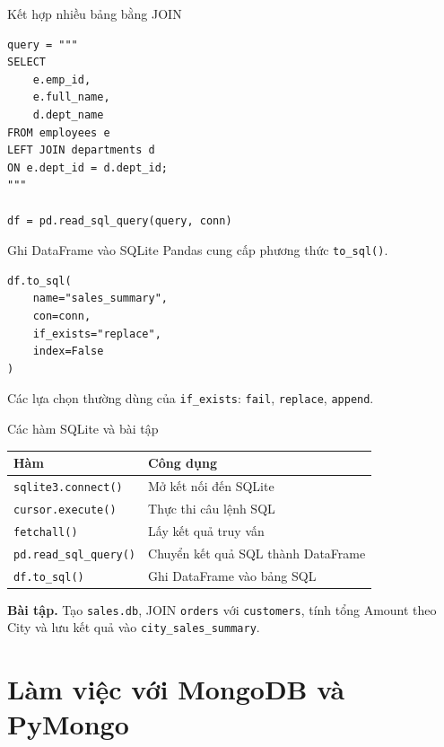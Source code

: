 \documentclass[aspectratio=169,11pt]{beamer}
\newcommand{\code}[1]{\texttt{#1}}
\newcommand{\smallgap}{\vspace{0.4em}}
\begin{document}
\begin{frame}[fragile]{Kết hợp nhiều bảng bằng JOIN}
\begin{lstlisting}[style=pythonstyle]
query = """
SELECT
    e.emp_id,
    e.full_name,
    d.dept_name
FROM employees e
LEFT JOIN departments d
ON e.dept_id = d.dept_id;
"""

df = pd.read_sql_query(query, conn)
\end{lstlisting}
\end{frame}

\begin{frame}[fragile]{Ghi DataFrame vào SQLite}
Pandas cung cấp phương thức \code{to\_sql()}.

\begin{lstlisting}[style=pythonstyle]
df.to_sql(
    name="sales_summary",
    con=conn,
    if_exists="replace",
    index=False
)
\end{lstlisting}

Các lựa chọn thường dùng của \code{if\_exists}: \code{fail}, \code{replace}, \code{append}.
\end{frame}

\begin{frame}{Các hàm SQLite và bài tập}
\begin{tabularx}{\textwidth}{lX}
\toprule
\textbf{Hàm} & \textbf{Công dụng} \\
\midrule
\code{sqlite3.connect()} & Mở kết nối đến SQLite \\
\code{cursor.execute()} & Thực thi câu lệnh SQL \\
\code{fetchall()} & Lấy kết quả truy vấn \\
\code{pd.read\_sql\_query()} & Chuyển kết quả SQL thành DataFrame \\
\code{df.to\_sql()} & Ghi DataFrame vào bảng SQL \\
\bottomrule
\end{tabularx}

\smallgap
\textbf{Bài tập.} Tạo \code{sales.db}, JOIN \code{orders} với \code{customers}, tính tổng Amount theo City và lưu kết quả vào \code{city\_sales\_summary}.
\end{frame}

\section{Làm việc với MongoDB và PyMongo}
\end{document}

